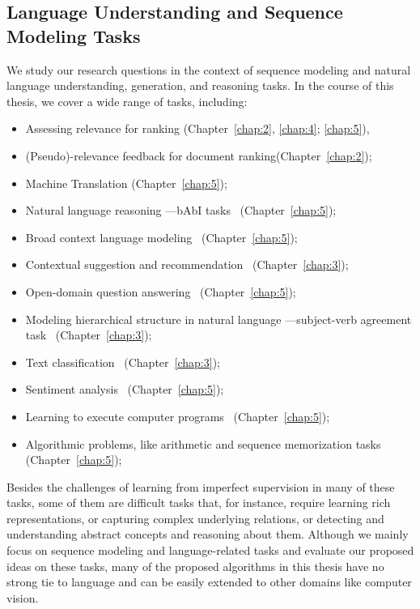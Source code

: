 \subsection{Language Understanding and Sequence Modeling Tasks}
We study our research questions in the context of sequence modeling and natural language understanding, generation, and reasoning tasks. In the course of this thesis, we cover a wide range of tasks, including:
\begin{itemize}
\item 
Assessing relevance for ranking (Chapter~\ref{chap:2}, \ref{chap:4}; \ref{chap:5}), 
%
\item 
(Pseudo)-relevance feedback for document ranking(Chapter~\ref{chap:2});
%
\item 
Machine Translation (Chapter~\ref{chap:5});
%
\item 
Natural language reasoning ---bAbI tasks~\citep{weston2015towards} (Chapter~\ref{chap:5});
%
\item 
Broad context language modeling~\citep{paperno2016lambada} (Chapter~\ref{chap:5});
%
\item 
Contextual suggestion and recommendation~\citep{hashemioverview} (Chapter~\ref{chap:3});
%
\item 
Open-domain question answering~\citep{dunn2017searchqa, dhingra2017quasar} (Chapter~\ref{chap:5});
%
\item 
Modeling hierarchical structure in natural language ---subject-verb agreement task~\citep{linzen2016assessing} (Chapter~\ref{chap:3});
%
\item 
Text classification~\citep{Hirst:2014} (Chapter~\ref{chap:3});
%
\item 
Sentiment analysis~\citep{rosenthal2017semeval, Nakov:2016, rosenthal:2015} (Chapter~\ref{chap:5}); 
%
\item 
Learning to execute computer programs~\citep{ZS14} (Chapter~\ref{chap:5}); 
%
\item 
Algorithmic problems, like arithmetic and sequence memorization tasks ~\citep{neural_gpu} (Chapter~\ref{chap:5});
\end{itemize}

Besides the challenges of learning from imperfect supervision in many of these tasks, some of them are difficult tasks that, for instance, require learning rich representations, or capturing complex underlying relations, or detecting and understanding abstract concepts and reasoning about them.
%
Although we mainly focus on sequence modeling and language-related tasks and evaluate our proposed ideas on these tasks, many of the proposed algorithms in this thesis have no strong tie to language and can be easily extended to other domains like computer vision.
%

